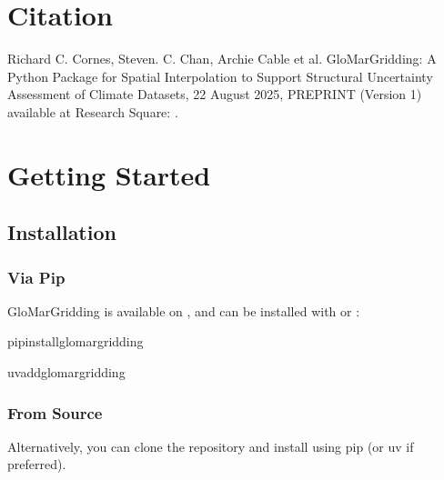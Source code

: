 \documentclass[letterpaper,10pt,english]{sphinxmanual}
\begin{document}
\chapter{Citation}
\label{\detokenize{introduction:citation}}
\sphinxAtStartPar
Richard C. Cornes, Steven. C. Chan, Archie Cable et al. GloMarGridding: A Python Package for Spatial
Interpolation to Support Structural Uncertainty Assessment of Climate Datasets, 22 August 2025,
PREPRINT (Version 1) available at Research Square: .

\sphinxstepscope


\chapter{Getting Started}
\label{\detokenize{getting_started:getting-started}}\label{\detokenize{getting_started::doc}}

\section{Installation}
\label{\detokenize{getting_started:installation}}

\subsection{Via Pip}
\label{\detokenize{getting_started:via-pip}}
\sphinxAtStartPar
GloMarGridding is available on , and can be
installed with  or :

\begin{sphinxVerbatim}[commandchars=\\\{\}]
pipinstallglomar\PYGZus{}gridding
\end{sphinxVerbatim}

\begin{sphinxVerbatim}[commandchars=\\\{\}]
uvaddglomar\PYGZus{}gridding
\end{sphinxVerbatim}


\subsection{From Source}
\label{\detokenize{getting_started:from-source}}
\sphinxAtStartPar
Alternatively, you can clone the repository and install using pip (or uv if preferred).
\end{document}
